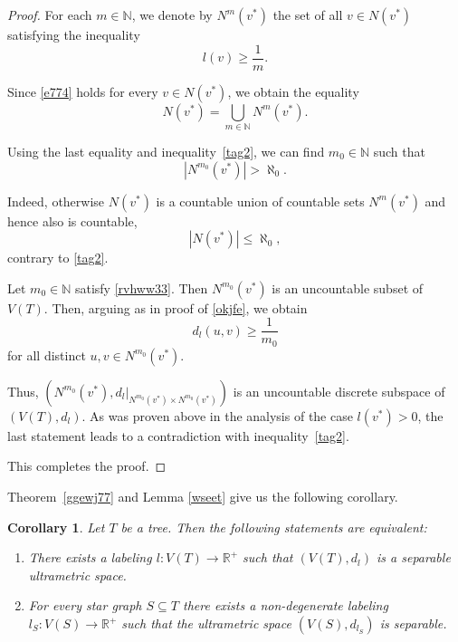 \documentclass[pdflatex,sn-mathphys-num]{sn-jnl}%
\newtheorem{corollary}{Corollary}%
\theoremstyle{thmstyletwo}%
\begin{document}
\begin{proof}
For each $m \in \mathbb{N}$, we denote by $N^m(v^*)$ the set of all $v \in N(v^*)$ satisfying the inequality
\begin{equation*}
l(v) \geq \frac{1}{m}.
\end{equation*}

Since \eqref{e774} holds for every $v \in N(v^*)$, we obtain the equality
\begin{equation*}
N(v^*) = \bigcup_{m \in \mathbb{N}} N^m(v^*).
\end{equation*}

Using the last equality and inequality~\eqref{tag2}, we can find $m_0 \in \mathbb{N}$ such that
\begin{equation}\label{rvhww33}
|N^{m_0}(v^*)| > \aleph_0. 
\end{equation}

Indeed, otherwise $N(v^*)$ is a countable union of countable sets $N^m(v^*)$ and hence also is countable,
\begin{equation*}
    |N(v^*)| \leq \aleph_0,
\end{equation*}
contrary to \eqref{tag2}.

Let $m_0 \in \mathbb{N}$ satisfy \eqref{rvhww33}. Then $N^{m_0}(v^*)$ is an uncountable subset of $V(T)$.
Then, arguing as in proof of \eqref{okjfe}, we obtain
\begin{equation*}
d_l(u, v) \geq \frac{1}{m_0}
\end{equation*}
for all distinct $u, v \in N^{m_0}(v^*)$.

Thus, $(N^{m_0}(v^*), d_l|_{N^{m_0}(v^*) \times N^{m_0}(v^*)})$ is an uncountable discrete subspace of $(V(T), d_l)$.
As was proven above in the analysis of the case $l(v^*) > 0$, the last statement leads to a contradiction with inequality~\eqref{tag2}.

This completes the proof.

\end{proof}

Theorem~\ref{ggewj77} and Lemma \ref{wseet} give us the following corollary.


\begin{corollary}\label{zaz}
    Let $T$ be a tree. Then the following statements are equivalent:

\begin{enumerate}[label=\textit{(\roman*)}, left=0pt]
    \item There exists a labeling $l \colon V(T) \to \mathbb{R}^+$ such that $(V(T), d_l)$ is a separable ultrametric space.

\item For every star graph $S \subseteq T$ there exists a non-degenerate labeling $l_S \colon V(S) \to \mathbb{R}^+$ such that the ultrametric space $(V(S), d_{l_S})$ is separable.

\end{enumerate}
\end{corollary}
\end{document}
